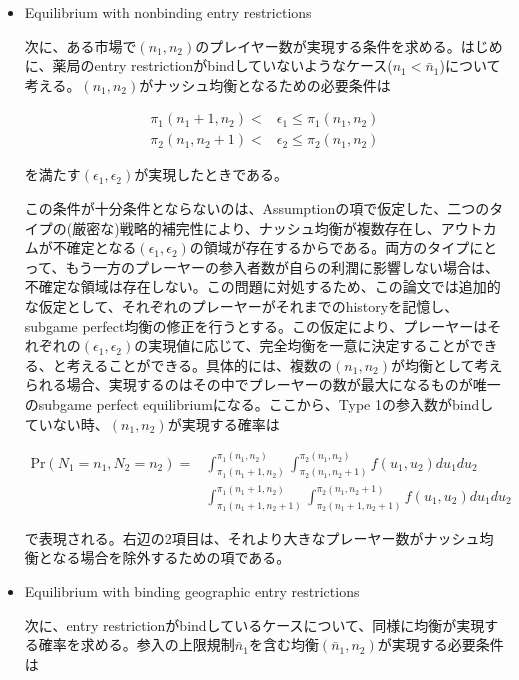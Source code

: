 \documentclass[11pt]{jsarticle}
\begin{document}
\begin{itemize}
  \item Equilibrium with nonbinding entry restrictions

  次に、ある市場で$(n_1, n_2)$のプレイヤー数が実現する条件を求める。はじめに、薬局のentry restrictionがbindしていないようなケース($n_1 < \bar{n}_1$)について考える。$(n_1, n_2)$がナッシュ均衡となるための必要条件は

  \begin{align*}
    \pi_1(n_1 + 1, n_2)<&\epsilon_1 \leq \pi_1(n_1, n_2) \\
    \pi_2(n_1, n_2 + 1) < & \epsilon_2 \leq \pi_2 (n_1, n_2)
  \end{align*}

  を満たす$(\epsilon_1, \epsilon_2)$が実現したときである。

  この条件が十分条件とならないのは、Assumptionの項で仮定した、二つのタイプの(厳密な)戦略的補完性により、ナッシュ均衡が複数存在し、アウトカムが不確定となる$(\epsilon_1, \epsilon_2)$の領域が存在するからである。両方のタイプにとって、もう一方のプレーヤーの参入者数が自らの利潤に影響しない場合は、不確定な領域は存在しない。この問題に対処するため、この論文では追加的な仮定として、それぞれのプレーヤーがそれまでのhistoryを記憶し、subgame perfect均衡の修正を行うとする。この仮定により、プレーヤーはそれぞれの$(\epsilon_1, \epsilon_2)$の実現値に応じて、完全均衡を一意に決定することができる、と考えることができる。具体的には、複数の$(n_1, n_2)$が均衡として考えられる場合、実現するのはその中でプレーヤーの数が最大になるものが唯一のsubgame perfect equilibriumになる。ここから、Type 1の参入数がbindしていない時、$(n_1, n_2)$が実現する確率は

  \begin{align*}
    \text{Pr}(N_1 = n_1, N_2 = n_2) =& \int_{\pi_1(n_1 + 1, n_2)}^{\pi_1(n_1, n_2)} \int_{\pi_2(n_1, n_2 + 1)}^{\pi_2(n_1, n_2)} f(u_1, u_2) du_1 du_2 \\
    &  \int_{\pi_1(n_1 + 1, n_2 + 1)}^{\pi_1(n_1 + 1, n_2)} \int_{\pi_2(n_1 + 1, n_2 + 1)}^{\pi_2(n_1, n_2 + 1)} f(u_1, u_2) du_1 du_2
  \end{align*}

で表現される。右辺の2項目は、それより大きなプレーヤー数がナッシュ均衡となる場合を除外するための項である。

\item Equilibrium with binding geographic entry restrictions

次に、entry restrictionがbindしているケースについて、同様に均衡が実現する確率を求める。参入の上限規制$\bar{n}_1$を含む均衡$(\bar{n}_1, n_2)$が実現する必要条件は


\end{itemize}
\end{document}
